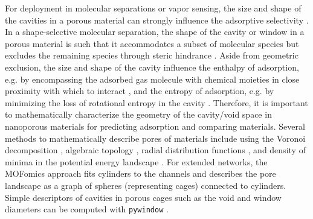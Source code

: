 \documentclass[journal=jacsat,manuscript=article,layout=traditional]{achemso}
\begin{document}
For deployment in molecular separations or vapor sensing, the size and shape of the cavities in a porous material can strongly influence the adsorptive selectivity \cite{mitra2013molecular,zhu1999shape,lee2018high,smit2008towards,sikora2012thermodynamic}. In a shape-selective molecular separation, the shape of the cavity or window in a porous material is such that it accommodates a subset of molecular species but excludes the remaining species through steric hindrance \cite{smit2008towards}. Aside from geometric exclusion, the size and shape of the cavity influence the enthalpy of adsorption, e.g. by encompassing the adsorbed gas molecule with chemical moieties in close proximity with which to interact \cite{simon2015best}, and the entropy of adsorption, e.g. by minimizing the loss of rotational entropy in the cavity \cite{denayer2005rotational}. Therefore, it is important to mathematically characterize the geometry of the cavity/void space in nanoporous materials for predicting adsorption and comparing materials. Several methods to mathematically describe pores of materials include using the Voronoi decomposition \cite{pinheiro2013characterization,martin2011addressing}, algebraic topology \cite{lee2017quantifying}, radial distribution functions \cite{fernandez2013atomic}, and density of minima in the potential energy landscape \cite{oganov2009quantify}. For extended networks, the MOFomics \cite{first2013mofomics} approach fits cylinders to the channels and describes the pore landscape as a graph of spheres (representing cages) connected to cylinders. Simple descriptors of cavities in porous cages such as the void and window diameters can be computed with \texttt{pywindow} \cite{miklitz2018pywindow}.
\end{document}
